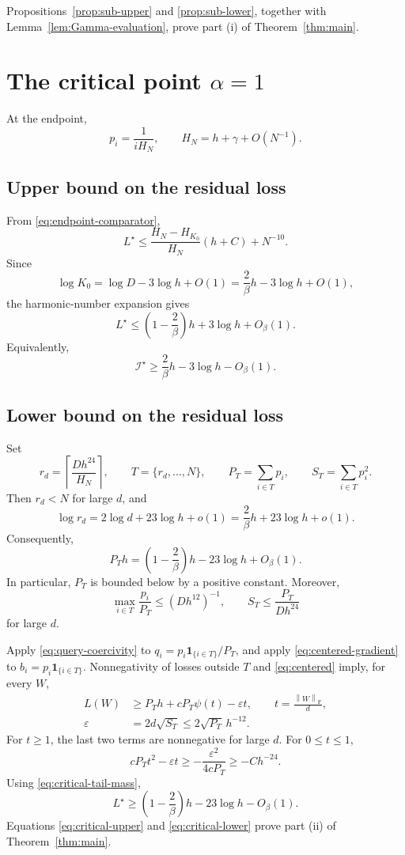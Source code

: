 \documentclass[11pt]{article}
\theoremstyle{remark}
\newcommand{\norm}[1]{\left\lVert #1\right\rVert}
\newcommand{\Frob}{\mathrm F}
\newcommand{\one}{\mathbf 1}
\newcommand{\cI}{\mathcal I}
\begin{document}
Propositions~\ref{prop:sub-upper} and \ref{prop:sub-lower}, together
with Lemma~\ref{lem:Gamma-evaluation}, prove part (i) of
Theorem~\ref{thm:main}.

\section{The critical point \(\alpha=1\)}
\label{sec:critical}

At the endpoint,
\[
 p_i=\frac1{iH_N},
 \qquad
 H_N=h+\gamma+O(N^{-1}).
\]

\subsection{Upper bound on the residual loss}

From \eqref{eq:endpoint-comparator},
\[
 L^\star
 \leq\frac{H_N-H_{K_0}}{H_N}(h+C)+N^{-10}.
\]
Since
\[
 \log K_0
 =\log D-3\log h+O(1)
 =\frac2\beta h-3\log h+O(1),
\]
the harmonic-number expansion gives
\begin{equation}
 L^\star
 \leq\left(1-\frac2\beta\right)h
 +3\log h+O_\beta(1).
 \label{eq:critical-upper}
\end{equation}
Equivalently,
\[
 \cI^\star
 \geq\frac2\beta h-3\log h-O_\beta(1).
\]

\subsection{Lower bound on the residual loss}

Set
\[
 r_d=\left\lceil\frac{Dh^{24}}{H_N}\right\rceil,
 \qquad
 T=\{r_d,\ldots,N\},
 \qquad
 P_T=\sum_{i\in T}p_i,
 \qquad
 S_T=\sum_{i\in T}p_i^2.
\]
Then \(r_d<N\) for large \(d\), and
\[
 \log r_d
 =2\log d+23\log h+o(1)
 =\frac2\beta h+23\log h+o(1).
\]
Consequently,
\begin{equation}
 P_Th
 =\left(1-\frac2\beta\right)h
 -23\log h+O_\beta(1).
 \label{eq:critical-tail-mass}
\end{equation}
In particular, \(P_T\) is bounded below by a positive constant.
Moreover,
\[
 \max_{i\in T}\frac{p_i}{P_T}
 \leq(Dh^{12})^{-1},
 \qquad
 S_T\leq\frac{P_T}{Dh^{24}}
\]
for large \(d\).

Apply \eqref{eq:query-coercivity} to
\(q_i=p_i\one_{\{i\in T\}}/P_T\), and apply
\eqref{eq:centered-gradient} to
\(b_i=p_i\one_{\{i\in T\}}\).  Nonnegativity of losses outside \(T\)
and \eqref{eq:centered} imply, for every \(W\),
\begin{align}
 L(W)
 &\geq
 P_Th+cP_T\psi(t)-\varepsilon t,
 \qquad
 t=\frac{\norm W_{\Frob}}d,\\
 \varepsilon&=2d\sqrt{S_T}
 \leq2\sqrt{P_T}\,h^{-12}.
 \label{eq:critical-master}
\end{align}
For \(t\geq1\), the last two terms are nonnegative for large \(d\).
For \(0\leq t\leq1\),
\[
 cP_Tt^2-\varepsilon t
 \geq-\frac{\varepsilon^2}{4cP_T}
 \geq-Ch^{-24}.
\]
Using \eqref{eq:critical-tail-mass},
\begin{equation}
 L^\star
 \geq
 \left(1-\frac2\beta\right)h
 -23\log h-O_\beta(1).
 \label{eq:critical-lower}
\end{equation}
Equations \eqref{eq:critical-upper} and
\eqref{eq:critical-lower} prove part (ii) of
Theorem~\ref{thm:main}.
\end{document}
